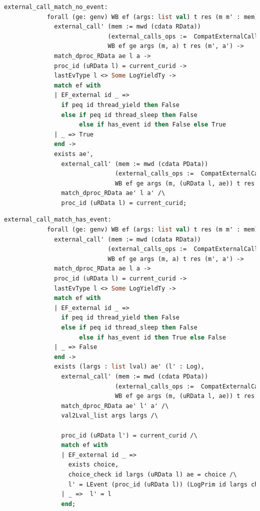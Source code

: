 \begin{lstlisting}[language=Caml]
          external_call_match_no_event:
            forall (ge: genv) WB ef (args: list val) t res (m m' : mem) (a a': RData) ae l,
              external_call' (mem := mwd (cdata RData)) 
                             (external_calls_ops :=  CompatExternalCalls.compatlayer_extcall_ops (phthread <@$\oplus$@>  L64))
                             WB ef ge args (m, a) t res (m', a') ->
              match_dproc_RData ae l a ->
              proc_id (uRData l) = current_curid ->
              lastEvType l <> Some LogYieldTy ->
              match ef with
              | EF_external id _ => 
                if peq id thread_yield then False
                else if peq id thread_sleep then False
                     else if has_event id then False else True
              | _ => True
              end -> 
              exists ae',
                external_call' (mem := mwd (cdata PData)) 
                               (external_calls_ops :=  CompatExternalCalls.compatlayer_extcall_ops (LH <@$\oplus$@>  L64))
                               WB ef ge args (m, (uRData l, ae)) t res (m', (uRData l, ae')) /\
                match_dproc_RData ae' l a' /\
                proc_id (uRData l) = current_curid;
\end{lstlisting}

\begin{lstlisting}[language=Caml]
          external_call_match_has_event:
            forall (ge: genv) WB ef (args: list val) t res (m m' : mem) (a a': RData) ae l,
              external_call' (mem := mwd (cdata RData)) 
                             (external_calls_ops :=  CompatExternalCalls.compatlayer_extcall_ops (phthread <@$\oplus$@>  L64))
                             WB ef ge args (m, a) t res (m', a') ->
              match_dproc_RData ae l a ->
              proc_id (uRData l) = current_curid ->
              lastEvType l <> Some LogYieldTy ->
              match ef with
              | EF_external id _ => 
                if peq id thread_yield then False
                else if peq id thread_sleep then False
                     else if has_event id then True else False
              | _ => False
              end -> 
              exists (largs : list lval) ae' (l' : Log),
                external_call' (mem := mwd (cdata PData)) 
                               (external_calls_ops :=  CompatExternalCalls.compatlayer_extcall_ops (LH <@$\oplus$@>  L64))
                               WB ef ge args (m, (uRData l, ae)) t res (m', (uRData l', ae')) /\
                match_dproc_RData ae' l' a' /\
                val2Lval_list args largs /\
                
                proc_id (uRData l') = current_curid /\
                match ef with 
                | EF_external id _ =>
                  exists choice,
                  choice_check id largs (uRData l) ae = choice /\
                  l' = LEvent (proc_id (uRData l)) (LogPrim id largs choice (snap_func ae)) :: l
                | _ =>  l' = l
                end;
\end{lstlisting}

